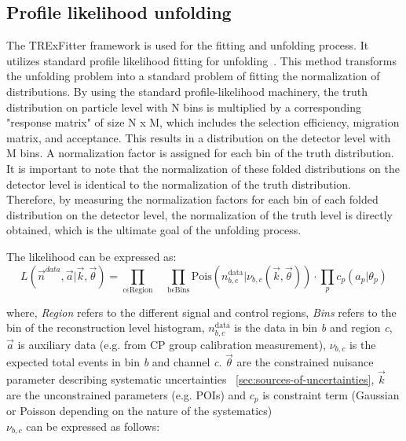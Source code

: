 \subsection{Profile likelihood unfolding}
\label{sec:profile-likelihodd-unfolding}
The TRExFitter framework is used for the fitting and unfolding process. It utilizes standard profile likelihood fitting for unfolding~\cite{cls_3}. This method transforms the unfolding problem into a standard problem of fitting the normalization of distributions. By using the standard profile-likelihood machinery, the truth distribution on particle level with N bins is multiplied by a corresponding "response matrix" of size N x M, which includes the selection efficiency, migration matrix, and acceptance. This results in a distribution on the detector level with M bins. A normalization factor is assigned for each bin of the truth distribution. It is important to note that the normalization of these folded distributions on the detector level is identical to the normalization of the truth distribution. Therefore, by measuring the normalization factors for each bin of each folded distribution on the detector level, the normalization of the truth level is directly obtained, which is the ultimate goal of the unfolding process.

The likelihood can be expressed as:
\begin{equation}\label{eq:likelihodd-defn}
	L(\vec{n}^{data},\vec{a} | \vec{k}, \vec{\theta}) = \prod_{\mathrm{c} \epsilon \mathrm{Region}} \quad \prod_{\mathrm{b} \epsilon \mathrm{Bins}} \mathrm{Pois} (n^{\mathrm{data}}_{b,c}|\nu_{b,c}(\vec{k}, \Vec{\theta})) \cdot \prod_{p} c_p(a_p|\theta_{p})
\end{equation}

where, \textit{Region} refers to the different signal and control regions, \textit{Bins} refers to the bin of the reconstruction level 
histogram, $n^{\mathrm{data}}_{b,c}$ is the data in bin \textit{b} and  region \textit{c}, $\vec{a}$ is auxiliary data (e.g. from CP group calibration measurement), $\nu_{b,c}$ is the expected total events in bin \textit{b} and channel \textit{c}. $\Vec{\theta}$ are the constrained nuisance parameter describing systematic uncertainties ~\cref{sec:sources-of-uncertainties}, $\vec{k}$ are the unconstrained parameters (e.g. POIs) and $c_p$ is constraint term (Gaussian or Poisson depending on the nature of the systematics)\\

$\nu_{b,c}$ can be expressed as follows:

